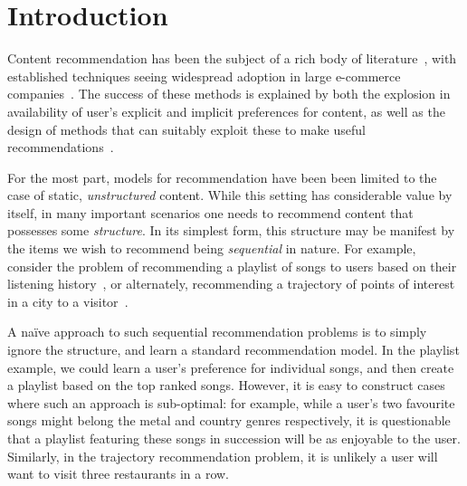 
\secmoveup
\section{Introduction}
\label{sec:intro}
\textmoveup

Content recommendation has been the subject of a rich body of literature~\citep{Goldberg:1992,Sarwar:2001,Koren:2010},
with established techniques seeing widespread adoption in large e-commerce companies~\citep{Linden:2003,Agarwal:2013,Amatriain:2015,Gomez-Uribe:2015}.
The success of these methods is explained by both the explosion in availability of user's explicit and implicit preferences for content,
as well as the design of methods that can suitably exploit these to make useful recommendations~\citep{Koren:2009}.

For the most part, models for recommendation have been been limited to the case of static, \emph{unstructured} content.
While this setting has considerable value by itself,
in many important scenarios one needs to recommend content that possesses some \emph{structure}.
In its simplest form, this structure may be manifest by the items we wish to recommend being \emph{sequential} in nature.
For example, consider the problem of recommending a playlist of songs to users based on their listening history~\citep{McFee:2011,chen2012playlist},
or alternately,
recommending a trajectory of points of interest in a city to a visitor~\citep{lu2010photo2trip,lu2012personalized,ijcai15,cikm16paper}.

A na\"{i}ve approach to such sequential recommendation problems is to simply ignore the structure,
and learn a standard recommendation model.
In the playlist example, we could learn a user's preference for individual songs,
and then create a playlist based on the top ranked songs.
However, it is easy to construct cases where such an approach is sub-optimal:
for example, while a user's two favourite songs might belong
the metal and country genres respectively,
it is questionable that a playlist featuring these songs in succession will be as enjoyable to the user.
Similarly, in the trajectory recommendation problem, it is unlikely a user will want to visit three restaurants in a row.


